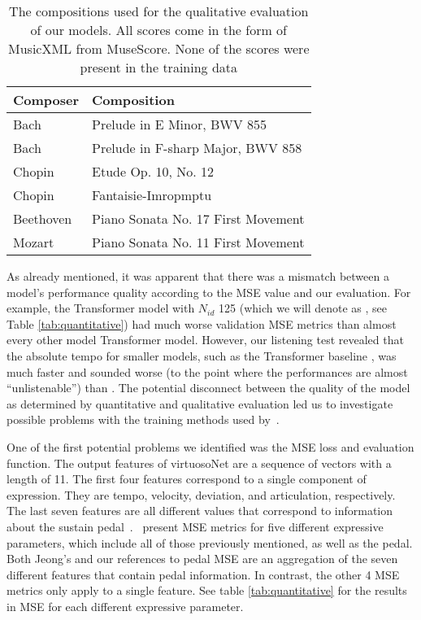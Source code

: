 \begin{table}
    \setlength{\extrarowheight}{3pt}
    \begin{center}
    \begin{tabular}[]{| l | l |}
        \hline
        Composer & Composition \\ 
        \hline 
        Bach & Prelude in E Minor, BWV 855 \\
        Bach & Prelude in F-sharp Major, BWV 858  \\ 
        Chopin & Etude Op. 10, No. 12 \\ 
        Chopin & Fantaisie-Imropmptu \\ 
        Beethoven & Piano Sonata No. 17 First Movement \\ 
        Mozart & Piano Sonata No. 11 First Movement \\ 
        \hline
    \end{tabular}
    \caption{The compositions used for the qualitative evaluation of our models. All scores come in the form of MusicXML from MuseScore. None of the scores were present in the training data}
    \label{tab:compositions}
    \end{center}
\end{table}

As already mentioned, it was apparent that there was a mismatch between a model's performance quality according to the MSE value and our evaluation. For example, the Transformer model with $N_{id}$ 125 (which we will denote as , see Table \ref{tab:quantitative}) had much worse validation MSE metrics than almost every other model Transformer model. However, our listening test revealed that the absolute tempo for smaller models, such as the Transformer baseline , was much faster and sounded worse (to the point where the performances are almost ``unlistenable'') than . The potential disconnect between the quality of the model as determined by quantitative and qualitative evaluation led us to investigate possible problems with the training methods used by~\citet{jeong2019virtuosonet}. 

One of the first potential problems we identified was the MSE loss and evaluation function. The output features of virtuosoNet are a sequence of vectors with a length of 11. The first four features correspond to a single component of expression. They are tempo, velocity, deviation, and articulation, respectively. The last seven features are all different values that correspond to information about the sustain pedal~\cite{jeong2019score}.~\citet{jeong2019virtuosonet} present MSE metrics for five different expressive parameters, which include all of those previously mentioned, as well as the pedal. Both Jeong's and our references to pedal MSE are an aggregation of the seven different features that contain pedal information. In contrast, the other 4 MSE metrics only apply to a single feature. See table \ref{tab:quantitative} for the results in MSE for each different expressive parameter.

